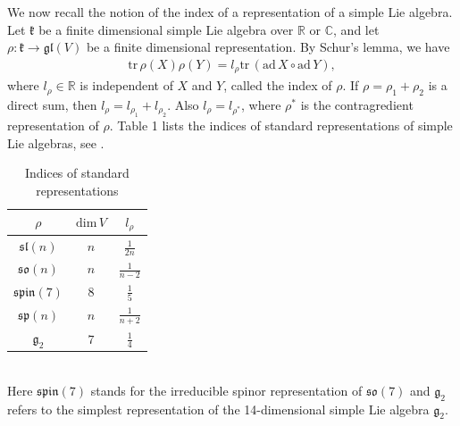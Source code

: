 \documentclass[reqno]{amsart}
\theoremstyle{definition}
\begin{document}
We now recall the notion of the index of a representation of a simple Lie algebra. Let $\mathfrak{k}$ be a finite dimensional simple Lie algebra over $\mathbb{R}$ or $\mathbb{C}$,  and let  $\rho:\mathfrak{k}\rightarrow \mathfrak{gl}(V)$ be a finite dimensional representation. By  Schur's lemma, we have
\begin{eqnarray*}
\mathrm{tr}\,\rho(X)\rho(Y)=l_{\rho}\mathrm{tr}\,(\mathrm{ad}\,X\circ\mathrm{ad}\,Y),
\end{eqnarray*}
where $l_{\rho}\in \mathbb{R}$ is  independent of $X$ and $Y$,  called the index of $\rho$. If $\rho=\rho_{1}+\rho_{2}$ is a direct sum, then $l_{\rho}=l_{\rho_{1}}+l_{\rho_{2}}$.
Also $l_{\rho}=l_{\rho^{*}}$, where $\rho^{*}$ is  the contragredient representation of  $\rho$.
 Table 1 lists the indices of standard representations of  simple Lie algebras,
 see \cite[Table III]{Kac}.
\begin{table}[htbp]\label{table1}
\caption{Indices of standard representations}
\centering
\setlength\tabcolsep{12 pt}
\renewcommand{\arraystretch}{1.3}
\begin{tabular}{|c|c|c|}
\hline
$\rho$                &  $\mathrm{dim}\,V$    &  $l_{\rho}$\\
\hline
$\mathfrak{sl}(n)$    &    $n$                &  $\frac{1}{2n}$\\
\hline
$\mathfrak{so}(n)$    &    $n$                &  $\frac{1}{n-2}$\\
\hline
$\mathfrak{spin}(7)$  &    $8$                &  $\frac{1}{5}$\\
\hline
$\mathfrak{sp}(n)$    &    $n$                &  $\frac{1}{n+2}$\\
\hline
$\mathfrak{g}_{2}$    &    $7$                &  $\frac{1}{4}$\\
\hline
\end{tabular}
\end{table}
\\Here $\mathfrak{spin}(7)$ stands for the irreducible spinor representation of $\mathfrak{so}(7)$ and $\mathfrak{g}_{2}$ refers to the simplest representation of the 14-dimensional simple Lie algebra $\mathfrak{g}_{2}$.
\end{document}

